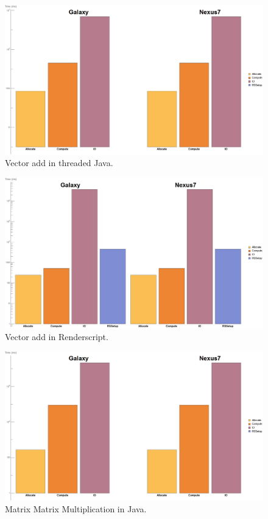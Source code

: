 \begin{figure}[t!]
\includegraphics[scale=0.125]{VectorAddThreadedJava.png}
\caption{Vector add in threaded Java.}
\label{fig:schedule}
\centering
\end{figure}


\begin{figure}[t!]
\includegraphics[scale=0.125]{VectorAddRS.png}
\caption{Vector add in Renderscript.}
\label{fig:schedule}
\centering
\end{figure}



\begin{figure}[t!]
\includegraphics[scale=0.125]{SgemmJava.png}
\caption{Matrix Matrix Multiplication in Java.}
\label{fig:schedule}
\centering
\end{figure}

